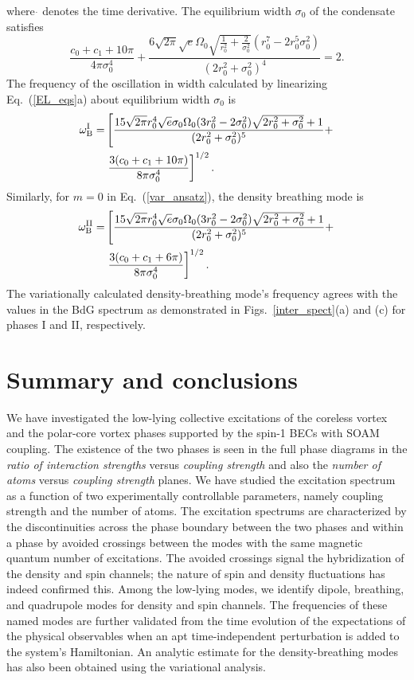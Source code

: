 \documentclass[pra,twocolumn,aps,superscriptaddress,showpacs,longbibliography]{revtex4-1}
\begin{document}
where $\Dot{}$ denotes the time derivative.
The equilibrium width $\sigma_{0}$ of the condensate satisfies
\begin{equation}
 \frac{c_0+c_1+10 \pi }{4 \pi  \sigma^4_{0}}+\frac{6 \sqrt{2 \pi } \sqrt{e} \Omega_0  \sqrt{\frac{1}{r_0^2}
 +\frac{2}{\sigma^2_{0}}} \left(r_0^7-2 r_0^5 \sigma^2_{0}\right)}{\left(2r_0^2+\sigma^2_{0}\right)^4}=2.\nonumber
\end{equation}
The frequency of the oscillation in width calculated by linearizing Eq.~(\ref{EL_eqs}a) about equilibrium width $\sigma_{0}$ is
\begin{align}
\omega_{\rm B}^{\rm I}=& \left[ \frac{15\sqrt{2\pi }r_0^4\sqrt{e}\sigma_{0} \Omega_0 (3 r_0^2-2\sigma^2_{0}) \sqrt{{2r_0^2}+{\sigma^2_{0}}}+1}{(2 r_0^2+\sigma^2_{0} )^5} +\right. \nonumber\\ & \left.\frac{3(c_0+c_1+10\pi)}{8\pi\sigma^4_{0}}\right]^{1/2}.
\end{align}
Similarly, for $m = 0$ in Eq.~(\ref{var_ansatz}), the density breathing mode is 
\begin{align}
\omega_{\rm B}^{\rm II}=&\left[\frac{15\sqrt{2\pi }r_0^4\sqrt{e}\sigma_{0} \Omega_0 (3 r_0^2-2\sigma^2_{0}) \sqrt{2{r_0^2}+{\sigma^2_{0}}}+1}{(2 r_0^2+\sigma^2_{0})^5}
+\right. \nonumber \\& \left.\frac{3(c_0+c_1+6\pi)}{8\pi\sigma^4_{0}}\right]^{1/2}.
\end{align}
The variationally calculated density-breathing mode's frequency agrees with the values in the BdG spectrum as
demonstrated in Figs.~\ref{inter_spect}(a) and (c) for phases I and II, respectively.

\section{Summary and conclusions}
\label{concl}
We have investigated the low-lying collective excitations of the coreless vortex and the polar-core vortex phases supported
by the spin-1 BECs with SOAM coupling. The existence of the two phases is seen in the full phase diagrams in the {\em ratio of interaction strengths} versus 
{\em coupling strength} and also the {\em number of atoms} versus {\em coupling strength} planes. We have studied the excitation spectrum as a function of
two experimentally controllable parameters, namely coupling 
strength and the number of atoms. The excitation spectrums are characterized
by the discontinuities across the phase boundary between the two phases and within a phase by avoided crossings between the modes with the same magnetic
quantum number of excitations. The  avoided crossings signal the hybridization of the density and spin channels; the nature of spin and density fluctuations 
has indeed confirmed this. Among the low-lying modes, we identify dipole, breathing, and quadrupole modes for density and spin channels.
The frequencies of these named modes are further validated from the time evolution of the expectations of the physical observables when
an apt time-independent perturbation is added to the system's Hamiltonian. An analytic estimate for the density-breathing modes
has also been obtained using the variational analysis.
\end{document}
